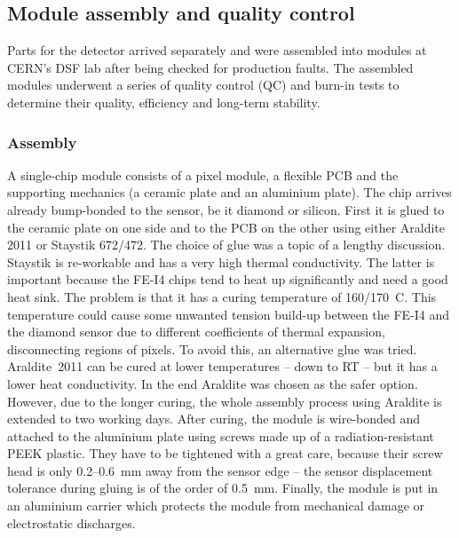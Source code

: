 \documentclass[12pt]{packages/mytustyle}  %
\begin{document}


\subsection{Module assembly and quality control}
Parts for the detector arrived separately and were assembled into modules at CERN's DSF lab after being checked for production faults. The assembled modules underwent a series of quality control (QC) and burn-in tests to determine their quality, efficiency and long-term stability.
\subsubsection{Assembly}
A single-chip module consists of a pixel module, a flexible PCB and the supporting mechanics (a ceramic plate and an aluminium plate). The chip arrives already bump-bonded to the sensor, be it diamond or silicon. First it is glued to the ceramic plate on one side and to the PCB on the other using either Araldite 2011 or Staystik 672/472. The choice of glue was a topic of a lengthy discussion. Staystik is re-workable and has a very high thermal conductivity. The latter is important because the FE-I4 chips tend to heat up significantly and need a good heat sink. The problem is that it has a curing temperature of 160/170~\textdegree C. This temperature could cause some unwanted tension build-up between the FE-I4 and the diamond sensor due to different coefficients of thermal expansion, disconnecting regions of pixels. To avoid this, an alternative glue was tried. Araldite~2011 can be cured at lower temperatures -- down to RT -- but it has a lower heat conductivity. In the end Araldite was chosen as the safer option. However, due to the longer curing, the whole assembly process using Araldite is extended to two working days. After curing, the module is wire-bonded and attached to the aluminium plate using screws made up of a radiation-resistant PEEK plastic. They have to be tightened with a great care, because their screw head is only 0.2--0.6~mm away from the sensor edge -- the sensor displacement tolerance during gluing is of the order of 0.5~mm. Finally, the module is put in an aluminium carrier which protects the module from mechanical damage or electrostatic discharges.
\end{document}
